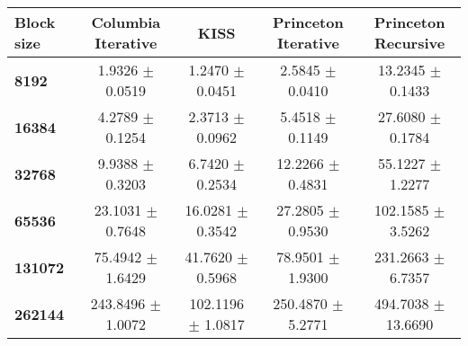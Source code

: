 \begin{tabular}{lcccc}\toprule
\textbf{Block size}  & \textbf{Columbia Iterative} & \textbf{KISS} & \textbf{Princeton Iterative} & \textbf{Princeton Recursive}\\\midrule
\textbf{8192}  & 1.9326 $\pm$ 0.0519 & 1.2470 $\pm$ 0.0451 & 2.5845 $\pm$ 0.0410 & 13.2345 $\pm$ 0.1433\\
\textbf{16384}  & 4.2789 $\pm$ 0.1254 & 2.3713 $\pm$ 0.0962 & 5.4518 $\pm$ 0.1149 & 27.6080 $\pm$ 0.1784\\
\textbf{32768}  & 9.9388 $\pm$ 0.3203 & 6.7420 $\pm$ 0.2534 & 12.2266 $\pm$ 0.4831 & 55.1227 $\pm$ 1.2277\\
\textbf{65536}  & 23.1031 $\pm$ 0.7648 & 16.0281 $\pm$ 0.3542 & 27.2805 $\pm$ 0.9530 & 102.1585 $\pm$ 3.5262\\
\textbf{131072}  & 75.4942 $\pm$ 1.6429 & 41.7620 $\pm$ 0.5968 & 78.9501 $\pm$ 1.9300 & 231.2663 $\pm$ 6.7357\\
\textbf{262144} & 243.8496 $\pm$ 1.0072 & 102.1196 $\pm$ 1.0817 & 250.4870 $\pm$ 5.2771 & 494.7038 $\pm$ 13.6690\\
\bottomrule
\end{tabular}
